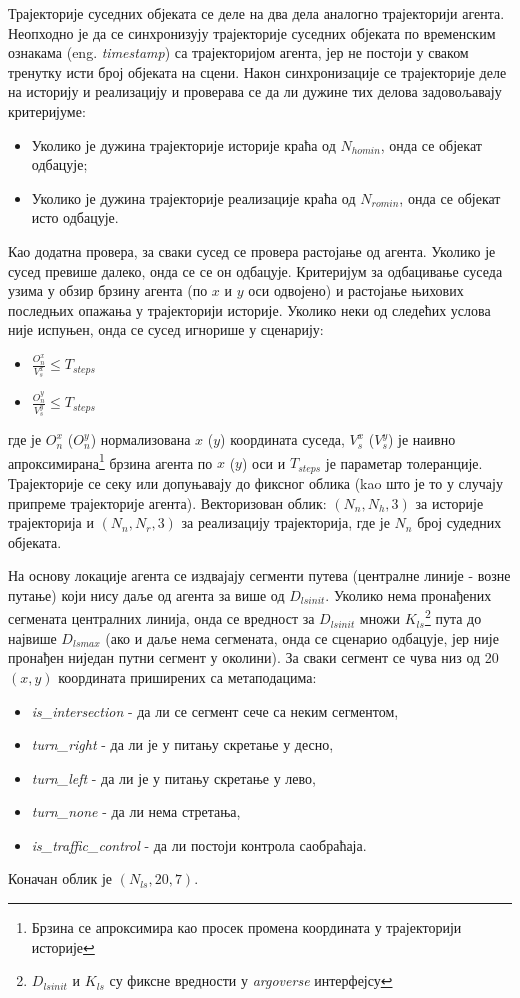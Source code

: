 \documentclass[11pt,oneside]{memoir}
\begin{document}
Трајекторије суседних објеката се деле на два дела аналогно трајекторији агента. Неопходно је да се синхронизују трајекторије 
суседних објеката по временским ознакама (eng. \textit{timestamp}) са трајекторијом агента, јер не постоји у сваком тренутку исти
број објеката на сцени. Након синхронизације се трајекторије деле на историју и реализацију и проверава се да ли дужине тих
делова задовољавају критеријуме:
\begin{itemize}
  \item Уколико је дужина трајекторије историје краћа од $N_{homin}$, онда се објекат одбацује;
  \item Уколико је дужина трајекторије реализације краћа од $N_{romin}$, онда се објекат исто одбацује.
\end{itemize}

Као додатна провера, за сваки сусед се провера растојање од агента. Уколико је сусед превише далеко, онда се се он одбацује.
Критеријум за одбацивање суседа узима у обзир брзину агента (по $x$ и $y$ оси одвојено) и растојање њихових последњих опажања
у трајекторији историје. Уколико неки од следећих услова није
испуњен, онда се сусед игнорише у сценарију: 
\begin{itemize}
  \item $\frac{O_n^x}{V_s^x} \leq T_{steps}$
  \item $\frac{O_n^y}{V_s^y} \leq T_{steps}$
\end{itemize}
где је $O_n^x$ ($O_n^y$) нормализована $x$ ($y$) координата суседа, $V_s^x$ ($V_s^y$) је наивно 
апроксимирана\footnote{Брзина се апроксимира као просек промена координата у трајекторији историје} брзина агента
по $x$ ($y$) оси и $T_{steps}$ је параметар толеранције.
Трајекторије се секу или допуњавају до фиксног облика (kao што је то у случају припреме трајекторије агента). 
Векторизован облик: $(N_n, N_h, 3)$ за историје трајекторија и $(N_n, N_r, 3)$ за реализацију трајекторија, где је $N_n$ број судедних објеката. 

На основу локације агента се издвајају сегменти путева (централне линије - возне путање) који нису даље од агента за више од $D_{lsinit}$. Уколико нема
пронађених сегмената централних линија, онда се вредност за $D_{lsinit}$ множи $K_{ls}$\footnote{$D_{lsinit}$ и $K_{ls}$ су фиксне вредности
у \textit{argoverse} интерфејсу} пута до највише $D_{lsmax}$ (ако и даље нема сегмената, 
онда се сценарио одбацује, јер није пронађен ниједан путни сегмент у околини). 
За сваки сегмент се чува низ од 20 $(x, y)$ координата приширених са метаподацима:
\begin{itemize} 
  \item \textit{is\_intersection} - да ли се сегмент сече са неким сегментом,
  \item \textit{turn\_right} - да ли је у питању скретање у десно, 
  \item \textit{turn\_left} - да ли је у питању скретање у лево, 
  \item \textit{turn\_none} - да ли нема стретања, 
  \item \textit{is\_traffic\_control} - да ли постоји контрола саобраћаја. 
\end{itemize}
Коначан облик је $(N_{ls}, 20, 7)$. 
\end{document}
